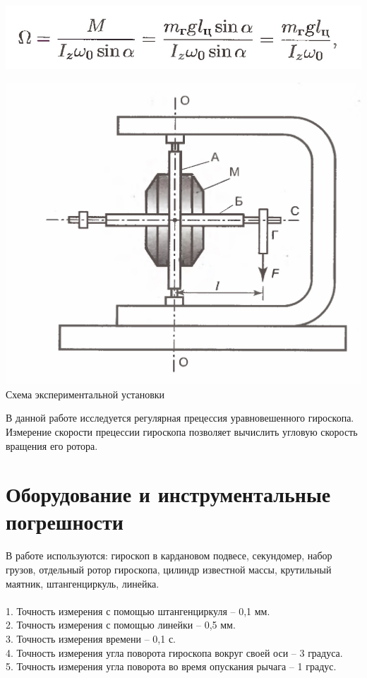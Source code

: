 \documentclass{article}
\begin{document}
\begin{center}
  \includegraphics[width=0.4\linewidth]{IMG_3.jpg}\\
 
 \end{center}

\begin{center}

  \includegraphics[width=0.5\linewidth]{IMG_4.jpg}\\
 
  Схема экспериментальной установки\\
 
 \end{center}

В данной работе исследуется регулярная прецессия уравновешенного гироскопа. 
Измерение скорости прецессии гироскопа позволяет вычислить угловую скорость вращения его ротора. 

\section{Оборудование и инструментальные погрешности}

В работе используются: гироскоп в кардановом подвесе, секундомер, набор грузов, отдельный ротор гироскопа, цилиндр известной массы, крутильный маятник, штангенциркуль, линейка.\\
\\
1. Точность измерения с помощью штангенциркуля -- 0,1 мм. \\
2. Точность измерения с помощью линейки -- 0,5 мм. \\
3. Точность измерения времени -- 0,1 с. \\
4. Точность измерения угла поворота гироскопа вокруг своей оси -- 3 градуса. \\
5. Точность измерения угла поворота во время опускания рычага -- 1 градус. \\
\end{document}
